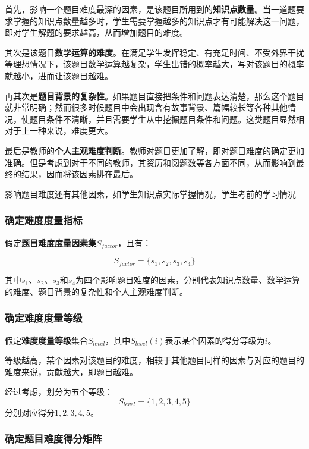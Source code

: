 首先，影响一个题目难度最深的因素，是该题目所用到的\textbf{知识点数量}。当一道题要求掌握的知识点数量越多时，学生需要掌握越多的知识点才有可能解决这一问题，即对学生解题的要求越高，从而增加题目的难度。

其次是该题目\textbf{数学运算的难度}。在满足学生发挥稳定、有充足时间、不受外界干扰等理想情况下，该题目数学运算越复杂，学生出错的概率越大，写对该题目的概率就越小，进而让该题目越难。

再其次是\textbf{题目背景的复杂性}。如果题目直接把条件和问题表达清楚，那么这个题目就非常明确；然而很多时候题目中会出现含有故事背景、篇幅较长等各种其他情况，使题目条件不清晰，并且需要学生从中挖掘题目条件和问题。这类题目显然相对于上一种来说，难度更大。

最后是教师的\textbf{个人主观难度判断}。教师对题目更加了解，即对题目难度的确定更加准确。但是考虑到对于不同的教师，其资历和阅题数等各方面不同，从而影响到最终的结果，因而将该因素排在最后。

影响题目难度还有其他因素，如学生知识点实际掌握情况，学生考前的学习情况

\subsubsection{确定难度度量指标}

假定\textbf{题目难度度量因素集}$S_{factor}$，且有：

\begin{equation}
    S_{factor} = \{ s_1, s_2, s_3, s_4 \}
\end{equation}

其中$s_1$、$s_2$、$s_3$和$s_4$为四个影响题目难度的因素，分别代表知识点数量、数学运算的难度、题目背景的复杂性和个人主观难度判断。

\subsubsection{确定难度度量等级}

假定\textbf{难度度量等级}集合$S_{level}$，其中$S_{level}(i)$表示某个因素的得分等级为$i$。

等级越高，某个因素对该题目的难度，相较于其他题目同样的因素与对应的题目的难度来说，贡献越大，即题目越难。

经过考虑，划分为五个等级：
$$S_{level} = \{1, 2, 3, 4, 5\}$$
分别对应得分$1, 2, 3, 4, 5$。

\subsubsection{确定题目难度得分矩阵}

